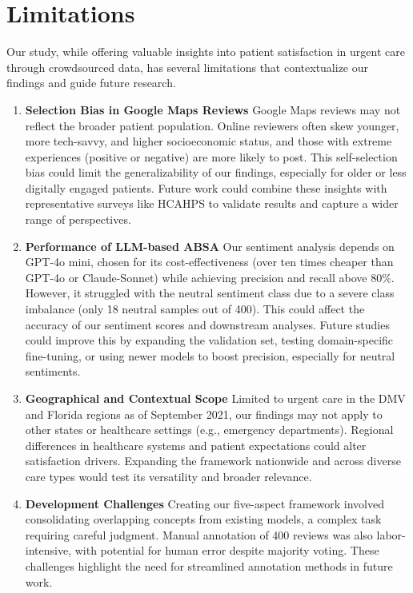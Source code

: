 \documentclass[journal,twoside,web]{ieeecolor}
\begin{document}
\section{Limitations}

Our study, while offering valuable insights into patient satisfaction in urgent care through crowdsourced data, has several limitations that contextualize our findings and guide future research.

\begin{enumerate}[leftmargin=*]

    \item \textbf{Selection Bias in Google Maps Reviews}  
    Google Maps reviews may not reflect the broader patient population. Online reviewers often skew younger, more tech-savvy, and higher socioeconomic status, and those with extreme experiences (positive or negative) are more likely to post. This self-selection bias could limit the generalizability of our findings, especially for older or less digitally engaged patients. Future work could combine these insights with representative surveys like HCAHPS to validate results and capture a wider range of perspectives.

    \item \textbf{Performance of LLM-based ABSA}  
    Our sentiment analysis depends on GPT-4o mini, chosen for its cost-effectiveness (over ten times cheaper than GPT-4o or Claude-Sonnet) while achieving precision and recall above 80\%. However, it struggled with the neutral sentiment class due to a severe class imbalance (only 18 neutral samples out of 400). This could affect the accuracy of our sentiment scores and downstream analyses. Future studies could improve this by expanding the validation set, testing domain-specific fine-tuning, or using newer models to boost precision, especially for neutral sentiments.

    \item \textbf{Geographical and Contextual Scope}  
    Limited to urgent care in the DMV and Florida regions as of September 2021, our findings may not apply to other states or healthcare settings (e.g., emergency departments). Regional differences in healthcare systems and patient expectations could alter satisfaction drivers. Expanding the framework nationwide and across diverse care types would test its versatility and broader relevance.

    \item \textbf{Development Challenges}  
    Creating our five-aspect framework involved consolidating overlapping concepts from existing models, a complex task requiring careful judgment. Manual annotation of 400 reviews was also labor-intensive, with potential for human error despite majority voting. These challenges highlight the need for streamlined annotation methods in future work.


\end{enumerate}
\end{document}
